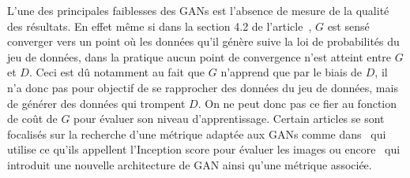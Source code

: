 \documentclass[11pt,francais]{article}
\begin{document}
L'une des principales faiblesses des GANs est l'absence de mesure de la qualité des résultats. En effet même si dans la section 4.2 de l'article~\cite{NIPS2014_5423}, \(G\) est sensé converger vers un point où les données qu'il génère suive la loi de probabilités du jeu de données, dans la pratique aucun point de convergence n'est atteint entre \(G\) et \(D\). Ceci est dû notamment au fait que \(G\) n'apprend que par le biais de \(D\), il n'a donc pas pour objectif de se rapprocher des données du jeu de données, mais de générer des données qui trompent \(D\). On ne peut donc pas ce fier au fonction de coût de \(G\) pour évaluer son niveau d'apprentissage. 
Certain articles se sont focalisés sur la recherche d'une métrique adaptée aux GANs comme dans~\cite{salimans2016improved} qui utilise ce qu'ils appellent l'Inception score pour évaluer les images ou encore~\cite{berthelot2017began} qui introduit une nouvelle architecture de GAN ainsi qu'une métrique associée.\\
\end{document}
